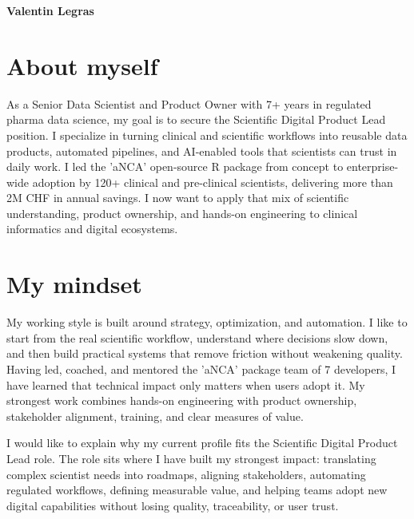 \documentclass[11pt,a4paper]{article}
\newcommand{\Position}{Scientific Digital Product Lead}
\begin{document}
{\Large\bfseries\color{accent} Valentin Legras}\\[10pt]

\section{About myself}
As a Senior Data Scientist and Product Owner with 7+ years in regulated pharma
data science, my goal is to secure the \Position{} position. I specialize in
turning clinical and scientific workflows into reusable data products,
automated pipelines, and AI-enabled tools that scientists can trust in daily
work. I led the 'aNCA' open-source R package from concept to enterprise-wide
adoption by 120+ clinical and pre-clinical scientists, delivering more than 2M
CHF in annual savings. I now want to apply that mix of scientific understanding,
product ownership, and hands-on engineering to clinical informatics and digital
ecosystems.

\section{My mindset}
My working style is built around strategy, optimization, and automation. I like
to start from the real scientific workflow, understand where decisions slow
down, and then build practical systems that remove friction without weakening
quality. Having led, coached, and mentored the 'aNCA' package team of 7
developers, I have learned that technical impact only matters when users adopt
it. My strongest work combines hands-on engineering with product ownership,
stakeholder alignment, training, and clear measures of value.

I would like to explain why my current profile fits the \Position{} role. The
role sits where I have built my strongest impact: translating complex scientist
needs into roadmaps, aligning stakeholders, automating regulated workflows,
defining measurable value, and helping teams adopt new digital capabilities
without losing quality, traceability, or user trust.
\end{document}
